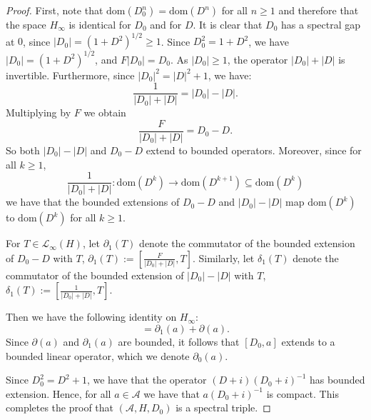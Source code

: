     \begin{proof} 
        First, note that $\mathrm{dom}(D_0^n) = \mathrm{dom}(D^n)$ for all $n\geq 1$ and therefore that the space $H_\infty$ is identical for $D_0$ and for $D$. It is clear that $D_0$ has a spectral gap at $0$, since $|D_0| = (1+D^2)^{1/2} \geq 1$.
        Since $D_0^2 = 1+D^2$, we have $|D_0| = (1+D^2)^{1/2}$, and $F|D_0| = D_0$.
        As $|D_0| \geq 1$, the operator $|D_0|+|D|$ is invertible. Furthermore, since $|D_0|^2 = |D|^2+1$, we have:
        \begin{equation*}
            \frac{1}{|D_0|+|D|} = |D_0|-|D|.
        \end{equation*}
        Multiplying by $F$ we obtain
        \begin{equation*}
        \frac{F}{|D_0|+|D|} = D_0-D.
        \end{equation*}
        So both $|D_0|-|D|$ and $D_0-D$ extend to bounded operators. Moreover, since for all $k\geq 1$,
        \begin{equation*}
            \frac{1}{|D_0|+|D|}:\mathrm{dom}(D^k)\to \mathrm{dom}(D^{k+1})\subseteq \mathrm{dom}(D^k)
        \end{equation*}
        we have that the bounded extensions of $D_0-D$ and $|D_0|-|D|$ map $\mathrm{dom}(D^k)$ to $\mathrm{dom}(D^k)$ for all $k\geq 1$.
        
        For $T \in \mathcal{L}_\infty(H)$, let $\partial_1(T)$ denote the commutator of the bounded extension of $D_0-D$ with $T$, $\partial_1(T) := [\frac{F}{|D_0|+|D|},T]$.
        Similarly, let $\delta_1(T)$ denote the commutator of the bounded extension of $|D_0|-|D|$ with $T$, $\delta_1(T) := [\frac{1}{|D_0|+|D|},T]$.
        
        Then we have the following identity on $H_\infty$:
        \begin{equation*}
            [D_0,a] = \partial_1(a)+\partial(a).
        \end{equation*}
        Since $\partial(a)$ and $\partial_1(a)$ are bounded, it follows that $[D_0,a]$ extends to a bounded linear operator, which we denote $\partial_0(a)$.
        
        Since $D_0^2 = D^2+1$, we have that the operator $(D+i)(D_0+i)^{-1}$ has bounded extension. Hence, for all $a \in \mathcal{A}$ we have that $a(D_0+i)^{-1}$ is compact.
        This completes the proof that $(\mathcal{A},H,D_0)$ is a spectral triple. 
        

\end{proof}
